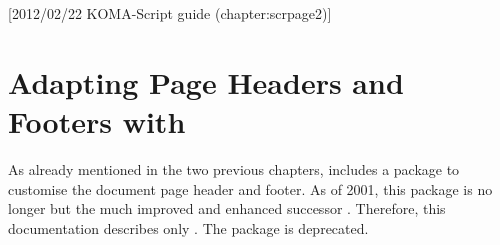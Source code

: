 %
%
%
%
%
%
%
%
% 
%
%
%
%

[2012/02/22 KOMA-Script guide (chapter:scrpage2)]



\chapter{Adapting Page Headers and Footers with }

%
%
As already mentioned in the two previous chapters, {\KOMAScript} includes a
package to customise the document page header and footer.  As of 2001, this
package is no longer  but the much
improved and enhanced successor .  Therefore, this
documentation describes only .  The package
 is deprecated.

